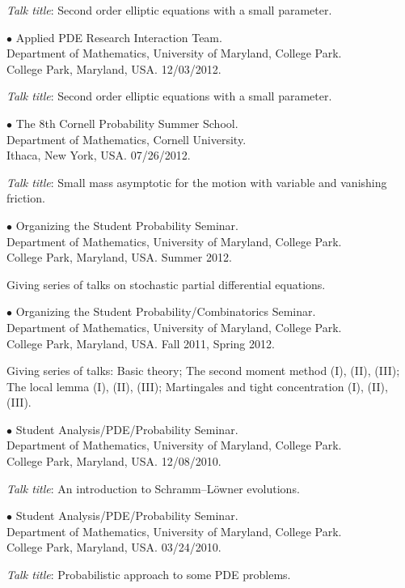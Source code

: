 \documentclass[margin,line]{res}
\begin{document}
\begin{resume}
\textit{Talk title}: Second order elliptic equations with a small
parameter.


{$\bullet$ Applied PDE Research Interaction Team. \\
Department of Mathematics, University of Maryland, College Park. \\
College Park, Maryland, USA.} \hfill 12/03/2012.

\textit{Talk title}: Second order elliptic equations with a small
parameter.


{$\bullet$ The 8th Cornell Probability Summer School. \\
Department of Mathematics, Cornell University. \\
Ithaca, New York, USA.} \hfill 07/26/2012.

\textit{Talk title}: Small mass asymptotic for the motion with
variable and vanishing friction.


{$\bullet$ Organizing the Student Probability Seminar. \\
Department of Mathematics, University of Maryland, College Park. \\
College Park, Maryland, USA.} \hfill Summer 2012.

Giving series of talks on stochastic partial differential equations.


{$\bullet$ Organizing the Student Probability/Combinatorics Seminar. \\
Department of Mathematics, University of Maryland, College Park. \\
College Park, Maryland, USA.}
\hfill Fall 2011, Spring 2012.

Giving series of talks: Basic theory; The second moment method (I),
(II), (III); The local lemma (I), (II), (III); Martingales and tight
concentration (I), (II), (III).


{$\bullet$ Student Analysis/PDE/Probability Seminar. \\
Department of Mathematics, University of Maryland, College Park. \\
College Park, Maryland, USA.} \hfill 12/08/2010.

\textit{Talk title}: An introduction to Schramm--L\"{o}wner
evolutions.


{$\bullet$ Student Analysis/PDE/Probability Seminar. \\
Department of Mathematics, University of Maryland, College Park. \\
College Park, Maryland, USA.} \hfill
03/24/2010.

\textit{Talk title}: Probabilistic approach to some PDE problems.








\end{resume}
\end{document}
